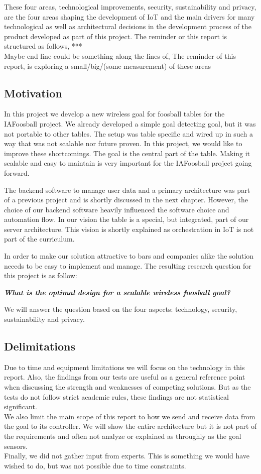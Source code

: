 These four areas, technological improvements, security, sustainability and privacy, are the four areas shaping the development of IoT and the main drivers for many technological as well as architectural decisions in the development process of the product developed as part of this project. The reminder or this report is structured as follows, ***\\
Maybe end line could be something along the lines of, The reminder of this report, is exploring a small/big/(some measurement) of these areas 

\subsection{Motivation}
In this project we develop a new wireless goal for foosball tables for the IAFoosball project. We already developed a simple goal detecting goal, but it was not portable to other tables. The setup was table specific and wired up in such a way that was not scalable nor future proven. In this project, we would like to improve these shortcomings. The goal is the central part of the table. Making  it scalable and easy to maintain is very important for the IAFoosball project going forward. 

The backend software to manage user data and a primary architecture was part of a previous project and is shortly discussed in the next chapter. However, the choice of our backend software heavily influenced the software choice and automation flow. 
In our vision the table is a special, but integrated, part of our server architecture. This vision is shortly explained as orchestration in IoT is not part of the curriculum.

In order to make our solution attractive to bars and companies alike the solution neeeds to be easy to implement and manage. The resulting research question for this project is as follow:

\begin{center}
    \textbf{\textit{What is the optimal design for a scalable wireless foosball goal?}}
\end{center}
We will answer the question based on the four aspects: technology, security, sustainability and privacy. 

\subsection{Delimitations}
Due to time and equipment limitations we will focus on the technology in this report. Also, the findings from our tests are useful as a general reference point when discussing the strength and weaknesses of competing solutions. But as the tests do not follow strict academic rules, these findings are not statistical significant. \\
We also limit the main scope of this report to how we send and receive data from the goal to its controller. We will show the entire architecture but it is not part of the requirements and often not analyze or explained as throughly as the goal sensors.\\
Finally, we did not gather input from experts. This is something we would have wished to do, but was not possible due to time constraints.
